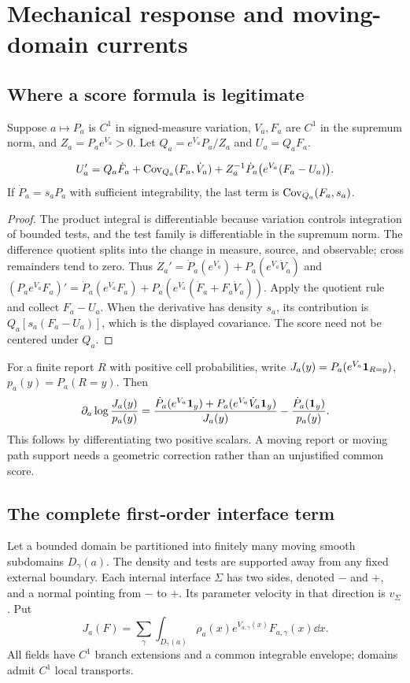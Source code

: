 \section{Mechanical response and moving-domain currents}\label{sec:response}
\subsection{Where a score formula is legitimate}
Suppose $a\mapsto P_a$ is $C^1$ in signed-measure variation, $V_a,F_a$ are $C^1$ in the supremum norm, and $Z_a=P_ae^{V_a}>0$. Let $Q_a=e^{V_a}P_a/Z_a$ and $U_a=Q_aF_a$.

\begin{theorem}\label{thm:regular-response}
\begin{equation}
 U_a'=Q_a\dot F_a+\operatorname{Cov}_{Q_a}(F_a,\dot V_a)
 +Z_a^{-1}\dot P_a\bigl(e^{V_a}(F_a-U_a)\bigr).
 \label{eq:separated-response}
\end{equation}
If $\dot P_a=s_aP_a$ with sufficient integrability, the last term is $\operatorname{Cov}_{Q_a}(F_a,s_a)$.
\end{theorem}
\begin{proof}
The product integral is differentiable because variation controls integration of bounded tests, and the test family is differentiable in the supremum norm. The difference quotient splits into the change in measure, source, and observable; cross remainders tend to zero. Thus
$Z_a'=\dot P_a(e^{V_a})+P_a(e^{V_a}\dot V_a)$ and
$(P_ae^{V_a}F_a)'=\dot P_a(e^{V_a}F_a)+P_a(e^{V_a}(\dot F_a+F_a\dot V_a))$.
Apply the quotient rule and collect $F_a-U_a$. When the derivative has density $s_a$, its contribution is $Q_a[s_a(F_a-U_a)]$, which is the displayed covariance. The score need not be centered under $Q_a$.
\end{proof}

For a finite report $R$ with positive cell probabilities, write
$J_a(y)=P_a(e^{V_a}\mathbf 1_{R=y})$, $p_a(y)=P_a(R=y)$. Then
\begin{equation}
 \partial_a\log\frac{J_a(y)}{p_a(y)}
 =\frac{\dot P_a(e^{V_a}\mathbf 1_y)+P_a(e^{V_a}\dot V_a\mathbf 1_y)}{J_a(y)}
 -\frac{\dot P_a(\mathbf 1_y)}{p_a(y)}.
 \label{eq:projected-response}
\end{equation}
This follows by differentiating two positive scalars. A moving report or moving path support needs a geometric correction rather than an unjustified common score.

\subsection{The complete first-order interface term}
Let a bounded domain be partitioned into finitely many moving smooth subdomains $D_\gamma(a)$. The density and tests are supported away from any fixed external boundary. Each internal interface $\Sigma$ has two sides, denoted $-$ and $+$, and a normal pointing from $-$ to $+$. Its parameter velocity in that direction is $v_\Sigma$. Put
\[
 J_a(F)=\sum_\gamma\int_{D_\gamma(a)}\rho_a(x)e^{V_{a,\gamma}(x)}F_{a,\gamma}(x)\dd x.
\]
All fields have $C^1$ branch extensions and a common integrable envelope; domains admit $C^1$ local transports.

